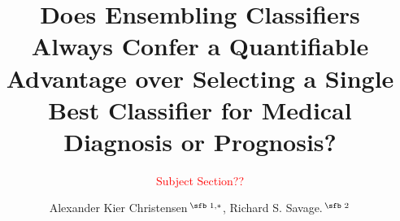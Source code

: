 \documentclass{bioinfo}
\begin{document}

\subtitle{\textcolor{red}{Subject Section??}}

\title[Is Ensembling Always Preferable for Medical Data?]{Does Ensembling Classifiers Always Confer a Quantifiable Advantage over Selecting a Single Best Classifier for Medical Diagnosis or Prognosis?}

\author[Christensen, A. K. \textit{et~al}.]{Alexander Kier Christensen\,$^{\text{\sfb 1,}*}$, Richard S. Savage.\,$^{\text{\sfb 2}}$}

\address{$^{\text{\sf 1}}$Systems Biology Centre, University of Warwick, Coventry, CV4 7ES, UK.
\newline
$^{\text{\sf 2}}$Systems Biology Centre, University of Warwick \& Warwick Medical School, Coventry, CV4 7ES, UK.}



\end{document}
